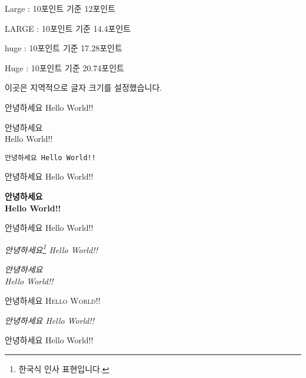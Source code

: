 \documentclass[12pt,a4paper,twoside, footnote]{oblivoir}
\theoremstyle{plain}
\theoremstyle{definition}
\theoremstyle{remark}
\begin{document}
\begin{center}
\Large Large : 10포인트 기준 12포인트

\LARGE LARGE : 10포인트 기준 14.4포인트

\huge huge : 10포인트 기준 17.28포인트

\Huge Huge : 10포인트 기준 20.74포인트

\begin{Large}
이곳은 지역적으로
글자 크기를 설정했습니다.

\begin{flushleft}
\textrm{안녕하세요 Hello World!!}

\textsf{안녕하세요\\ Hello World!!}

\texttt{안녕하세요 Hello World!!}
\end{flushleft}

\begin{flushright}

\textmd{안녕하세요 Hello World!!}

\textbf{안녕하세요\\ Hello World!!}

\textup{안녕하세요 Hello World!!}

\end{flushright}

\begin{center}

\textit{안녕하세요\footnote{한국식 인사 표현입니다.} Hello World!!}

\textsl{안녕하세요\\ Hello World!!}

\textsc{안녕하세요 Hello World!!}

\emph{안녕하세요 Hello World!!}

\textnormal{안녕하세요 Hello World!!}
\end{center}
\end{Large}
\end{center}
\end{document}
